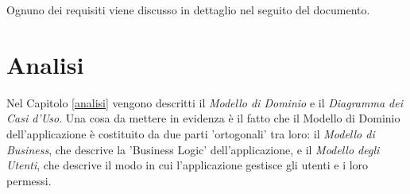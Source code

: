 Ognuno dei requisiti viene discusso in dettaglio nel seguito del documento.

\section{Analisi}
Nel Capitolo \ref{analisi} vengono descritti il \textsl{Modello di Dominio} e il \textsl{Diagramma dei Casi d'Uso}. Una cosa da mettere in evidenza è il fatto che il Modello di Dominio dell'applicazione è costituito da due parti 'ortogonali' tra loro: il \textsl{Modello di Business}, che descrive la 'Business Logic' dell'applicazione, e il \textsl{Modello degli Utenti}, che descrive il modo in cui l'applicazione gestisce gli utenti e i loro permessi.

\begin{comment}
\paragraph{Modello di Dominio}
Il Modello di Dominio è una descrizione delle relazioni tra le \textsl{classi} dell'applicazione: senza addentrarsi nei dettagli della \textsl{Programmazione ad Oggetti}, il concetto è che una classe rappresenta un oggetto del mondo reale; così una \textsl{Convenzione} diventa un \textsl{Agreement} nella nostra applicazione, come un \textsl{Responsabile Scientifico} diventa uno \textsl{ChiefScientist}.\newline 
I termini del Modello di Dominio sono in inglese, come si usa fare nell'Ingegneria del Software, perciò di solito si stila un \textsl{Dizionario} che associa termini del dominio a termini del modello: ad esempio, nel dizionario si scriverà qualcosa tipo ''Convenzione = Agreement'', così da non perdersi nelle eventuali ambiguità provocate dall'uso di due lingue diverse.\newline
Quest'ultimo aspetto è una delle caratteristiche più utili di un modello di dominio: specifica un insieme di termini non ambigui che si riferiscono al dominio. In questo modo tutte le volte che ci si riferirà ad un Responsabile Scientifico si scriverà "Responsabile Scientifico", e non "Docente" per esempio, così che non ci sia modo di confondersi. Sembra un problema di poco conto, ma è fondamentale mettersi d'accordo su come ci si riferisce ad uno stesso concetto, per evitare che il caos prenda il controllo e regni sovrano.

\end{comment}
